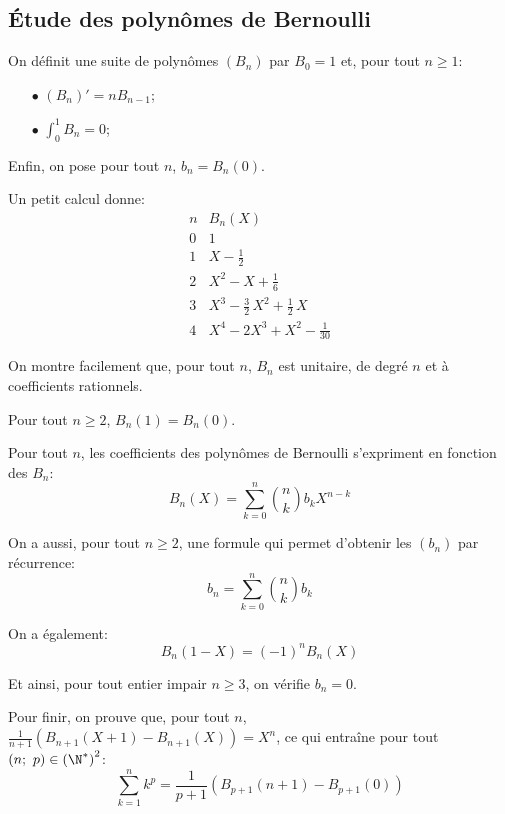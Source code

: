 \subsection{Étude des polynômes de Bernoulli}

\begin{de}
\label{poly_bernoulli}
On définit une suite de polynômes $(B_n)$ par $B_0 = 1$ et, pour tout $n \geq 1$:
\begin{itemize}
\item[$\bullet$] 
$(B_{n})' = n B_{n-1}$;
\item[$\bullet$] 
$\displaystyle{\int_0^1} B_n = 0$;
\end{itemize}

Enfin, on pose pour tout $n$, $b_n = B_n(0)$.
\end{de}

\begin{listremarques}
\item
Un petit calcul donne:
\[
\begin{array}{|c|c|}
\hline
n & B_n(X) \\ \hline \hline
0 & 1 \\
1 & X - \frac{1}{2} \\
2 & X^2-X+\frac{1}{6} \\
3 & X^3 - \frac{3}{2} \, X^2 + \frac{1}{2} \, X \\
4 & X^4 - 2X^3 + X^2 - \frac{1}{30}
\end{array}
\]
\item
On montre facilement que, pour tout $n$, $B_n$ est unitaire, de degré $n$ et à coefficients rationnels.
\end{listremarques}

\begin{prop}
Pour tout $n \geq 2$, $B_n(1) = B_n(0)$.

\medskip
Pour tout $n$, les coefficients des polynômes de Bernoulli s'expriment en fonction des $B_n$:
\[
B_n(X) = \displaystyle{\sum_{k=0}^n} {n \choose k} b_k X^{n-k}
\]

\medskip
On a aussi, pour tout $n \geq 2$, une formule qui permet d'obtenir les $(b_n)$ par récurrence:
\[
b_n =  \displaystyle{\sum_{k=0}^n} {n \choose k} b_k
\]

\medskip
On a également:
\[
B_n(1-X) = (-1)^nB_n(X)
\]

\medskip
Et ainsi, pour tout entier impair $n \geq 3$, on vérifie $b_n = 0$.

\medskip
Pour finir, on prouve que, pour tout $n$, $\frac{1}{n+1}\left (B_{n+1}(X+1) - B_{n+1}(X)\right ) = X^n$, ce qui entraîne pour tout $(n;~p) \in \left (\N^*\right )^2$:
\[
\displaystyle{\sum_{k=1}^n} k^p = \frac{1}{p+1} \left (B_{p+1}(n+1) -  B_{p+1}(0) \right )
\]
\end{prop}

